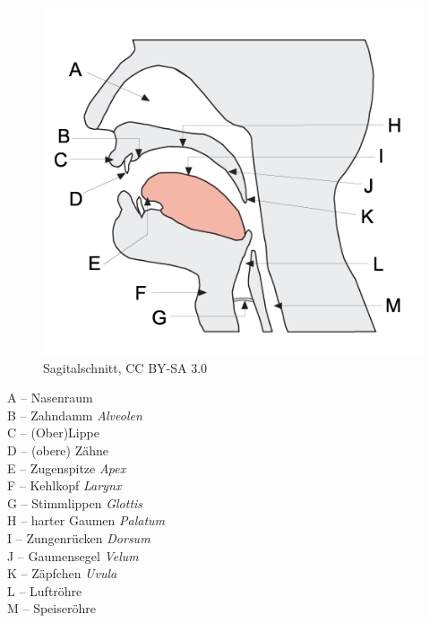 \begin{frame}

\begin{minipage}{0.48\textwidth}
	\begin{figure}
	\centering
	\includegraphics[scale=0.32]{material/04phonoatonomy}
	\caption{Sagitalschnitt, CC BY-SA 3.0}
	\end{figure}
\end{minipage}\hfill
\begin{minipage}{0.4\textwidth}
	A -- Nasenraum\\
	B -- Zahndamm \emph{Alveolen}\\
	C -- (Ober)Lippe \\
	D -- (obere) Zähne\\
	E -- Zugenspitze \emph{Apex}\\
	F -- Kehlkopf \emph{Larynx}\\
	G -- Stimmlippen \emph{Glottis}\\
	H -- harter Gaumen \emph{Palatum}\\
	I -- Zungenrücken \emph{Dorsum}\\
	J -- Gaumensegel \emph{Velum}\\
	K -- Zäpfchen \emph{Uvula}\\
	L -- Luftröhre\\ 
	M -- Speiseröhre
\end{minipage}
	
%		
	
\end{frame}



